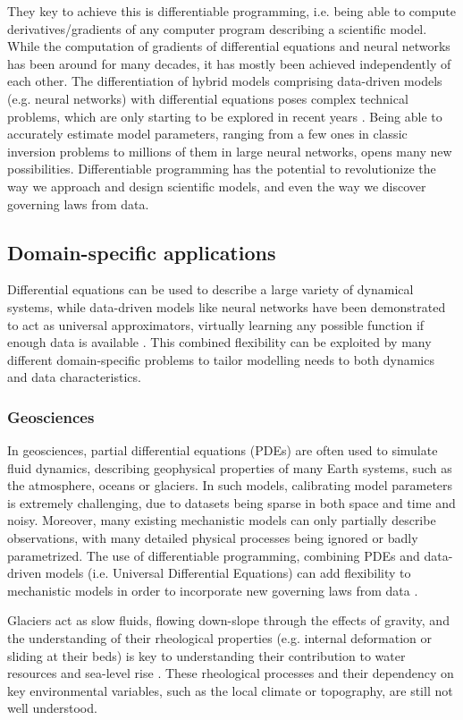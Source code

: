 They key to achieve this is differentiable programming, i.e. being able to compute derivatives/gradients of any computer program describing a scientific model. While the computation of gradients of differential equations and neural networks has been around for many decades, it has mostly been achieved independently of each other. The differentiation of hybrid models comprising data-driven models (e.g. neural networks) with differential equations poses complex technical problems, which are only starting to be explored in recent years \cite{ma_comparison_2021}. Being able to accurately estimate model parameters, ranging from a few ones in classic inversion problems to millions of them in large neural networks, opens many new possibilities. Differentiable programming has the potential to revolutionize the way we approach and design scientific models, and even the way we discover governing laws from data. 

\subsection{Domain-specific applications}

Differential equations can be used to describe a large variety of dynamical systems, while data-driven models like neural networks have been demonstrated to act as universal approximators, virtually learning any possible function if enough data is available \cite{gorban_1998}. This combined flexibility can be exploited by many different domain-specific problems to tailor modelling needs to both dynamics and data characteristics.

\subsubsection{Geosciences}

In geosciences, partial differential equations (PDEs) are often used to simulate fluid dynamics, describing geophysical properties of many Earth systems, such as the atmosphere, oceans or glaciers. In such models, calibrating model parameters is extremely challenging, due to datasets being sparse in both space and time and noisy. Moreover, many existing mechanistic models can only partially describe observations, with many detailed physical processes being ignored or badly parametrized. The use of differentiable programming, combining PDEs and data-driven models (i.e. Universal Differential Equations) can add flexibility to mechanistic models in order to incorporate new governing laws from data \cite{rackauckas2020universal}.

Glaciers act as slow fluids, flowing down-slope through the effects of gravity, and the understanding of their rheological properties (e.g. internal deformation or sliding at their beds) is key to understanding their contribution to water resources and sea-level rise \cite{cuffey_physics_2010}. These rheological processes and their dependency on key environmental variables, such as the local climate or topography, are still not well understood. 

